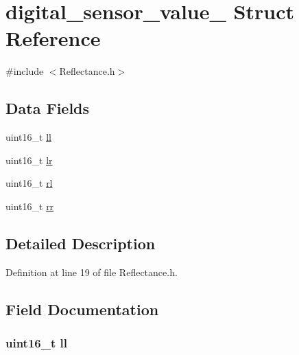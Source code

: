\hypertarget{structdigital__sensor__value__}{}\section{digital\+\_\+sensor\+\_\+value\+\_\+ Struct Reference}
\label{structdigital__sensor__value__}


{\ttfamily \#include $<$Reflectance.\+h$>$}

\subsection*{Data Fields}
\begin{DoxyCompactItemize}
\item 
uint16\+\_\+t \hyperlink{structdigital__sensor__value___ae59d16ddcc59d6f6633ff99307ff7190}{ll}
\item 
uint16\+\_\+t \hyperlink{structdigital__sensor__value___af650f74b54fbe6d55c96161d2a7098ea}{lr}
\item 
uint16\+\_\+t \hyperlink{structdigital__sensor__value___a55f8b53aee5b41e8af88a816fab2b70b}{rl}
\item 
uint16\+\_\+t \hyperlink{structdigital__sensor__value___a6988d1a89f109b3f8d0e06547a5362f6}{rr}
\end{DoxyCompactItemize}


\subsection{Detailed Description}


Definition at line 19 of file Reflectance.\+h.



\subsection{Field Documentation}
\subsubsection[{\texorpdfstring{ll}{ll}}]{\setlength{\rightskip}{0pt plus 5cm}uint16\+\_\+t ll}\hypertarget{structdigital__sensor__value___ae59d16ddcc59d6f6633ff99307ff7190}{}\label{structdigital__sensor__value___ae59d16ddcc59d6f6633ff99307ff7190}


